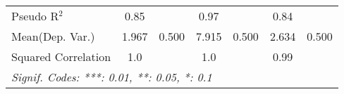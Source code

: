 \begin{tabular}{lcccccc}
   Pseudo R$^2$                                               & 0.85          &      & 0.97          &      & 0.84          & \\  
Mean(Dep. Var.) & 1.967 & 0.500 & 7.915 & 0.500 & 2.634 & 0.500 \\
   Squared Correlation                                        & 1.0           &      & 1.0           &      & 0.99          & \\  
   \midrule \midrule
   \multicolumn{7}{l}{\emph{Signif. Codes: ***: 0.01, **: 0.05, *: 0.1}}\\
\end{tabular}
\par\endgroup
